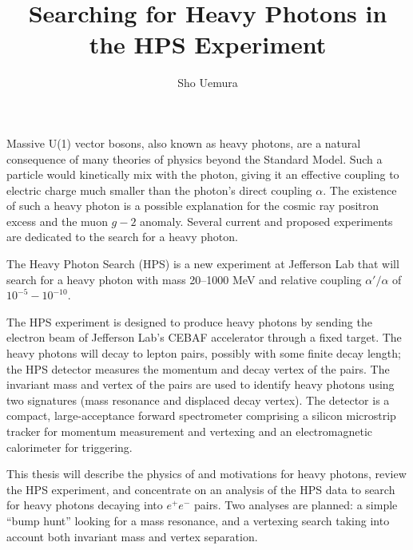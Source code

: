 \documentclass[12pt,letterpaper]{article}
\author{Sho Uemura}
\title{Searching for Heavy Photons in the HPS Experiment}
\date{}
\begin{document}
\maketitle

Massive U(1) vector bosons, also known as heavy photons, are a natural consequence of many theories of physics beyond the Standard Model. Such a particle would kinetically mix with the photon, giving it an effective coupling to electric charge much smaller than the photon's direct coupling $\alpha$. The existence of such a heavy photon is a possible explanation for the cosmic ray positron excess and the muon $g-2$ anomaly. Several current and proposed experiments are dedicated to the search for a heavy photon.

The Heavy Photon Search (HPS) is a new experiment at Jefferson Lab that will search for a heavy photon with mass 20--1000 MeV and relative coupling $\alpha'/\alpha$ of $10^{-5}-10^{-10}$. 



The HPS experiment is designed to produce heavy photons by sending the electron beam of Jefferson Lab's CEBAF accelerator through a fixed target. The heavy photons will decay to lepton pairs, possibly with some finite decay length; the HPS detector measures the momentum and decay vertex of the pairs. The invariant mass and vertex of the pairs are used to identify heavy photons using two signatures (mass resonance and displaced decay vertex).
The detector is a compact, large-acceptance forward spectrometer comprising a silicon microstrip tracker for momentum measurement and vertexing and an electromagnetic
calorimeter for triggering.


This thesis will describe the physics of and motivations for heavy photons, review the HPS experiment, and concentrate on an analysis of the HPS data to search for heavy photons decaying into $e^+e^-$ pairs.  Two analyses are planned: a simple ``bump hunt'' looking for a mass resonance, and a vertexing search taking into account both invariant mass and vertex separation.

\end{document}
